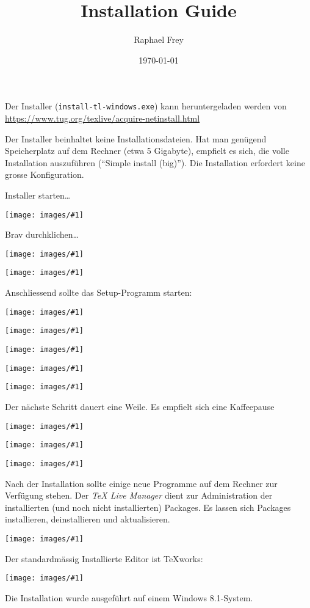 \documentclass[a4paper,11pt]{article}
\title{\tl{} Installation Guide}
\author{Raphael Frey}
\date{\today}
\newcommand{\screenshot}[1]{%
    \noindent\begin{minipage}{\textwidth}
        \vspace{1em}
        \centering
        \texttt{[image: images/\#1]}
        \vspace{1em}
    \end{minipage}}
\begin{document}
\maketitle

Der Installer (\texttt{install-tl-windows.exe}) kann heruntergeladen werden von \\
\href{https://www.tug.org/texlive/acquire-netinstall.html}
     {https://www.tug.org/texlive/acquire-netinstall.html}

Der  Installer  beinhaltet   keine  Installationsdateien. Hat  man  gen\"ugend
Speicherplatz  auf  dem Rechner  (etwa  5  Gigabyte),  empfielt es  sich,  die
volle Installation auszuf\"uhren  (``Simple install (big)''). Die Installation
erfordert keine grosse Konfiguration.

\vspace{1em}
Installer starten\ldots

\screenshot{texlive00.png}

\newpage
Brav durchklichen\ldots

\screenshot{texlive01.png}
\screenshot{texlive02.png}

\newpage

Anschliessend sollte das Setup-Programm starten:

\screenshot{texlive03.png}
\screenshot{texlive04.png}
\screenshot{texlive05.png}
\screenshot{texlive06.png}
\screenshot{texlive07.png}

Der n\"achste Schritt dauert eine Weile. Es empfielt sich eine Kaffeepause\footnotemark


\screenshot{texlive08.png}
\screenshot{texlive09.png}
\screenshot{texlive10.png}

\newpage
Nach  der  Installation sollte  einige  neue  Programme  auf dem  Rechner  zur
Verf\"ugung stehen. Der  \emph{TeX Live Manager} dient  zur Administration der
installierten (und noch nicht installierten) Packages. Es lassen sich Packages
installieren, deinstallieren und aktualisieren.

\screenshot{texlive13.png}

Der     standardm\"assig     Installierte      Editor     ist     \TeX{}works:

\screenshot{texworks0.png}

Die Installation wurde ausgef\"uhrt auf einem Windows 8.1-System.
\end{document}
